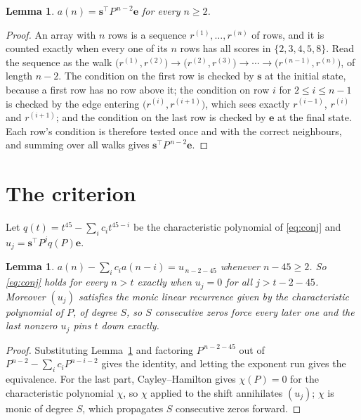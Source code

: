 \documentclass[11pt,a4paper]{article}
\theoremstyle{plain}
\newtheorem{lemma}[theorem]{Lemma}
\theoremstyle{definition}
\begin{document}
\begin{lemma}\label{lem:walk}
$a(n)=\mathbf{s}^{\!\top}P^{\,n-2}\mathbf{e}$ for every $n\ge2$.
\end{lemma}

\begin{proof}
An array with $n$ rows is a sequence $r^{(1)},\dots,r^{(n)}$ of rows, and it is counted
exactly when every one of its $n$ rows has all scores in $\{2,3,4,5,8\}$. Read the sequence as the
walk $\bigl(r^{(1)},r^{(2)}\bigr)\to\bigl(r^{(2)},r^{(3)}\bigr)\to\cdots\to
\bigl(r^{(n-1)},r^{(n)}\bigr)$, of length $n-2$. The condition on the first row is
checked by $\mathbf{s}$ at the initial state, because a first row has no row above it; the
condition on row $i$ for $2\le i\le n-1$ is checked by the edge entering
$\bigl(r^{(i)},r^{(i+1)}\bigr)$, which sees exactly $r^{(i-1)}$, $r^{(i)}$ and
$r^{(i+1)}$; and the condition on the last row is checked by $\mathbf{e}$ at the final
state. Each row's condition is therefore tested once and with the correct neighbours, and
summing over all walks gives $\mathbf{s}^{\!\top}P^{\,n-2}\mathbf{e}$.
\end{proof}

\section{The criterion}

Let $q(t)=t^{45}-\sum_i c_i t^{45-i}$ be the characteristic polynomial of
\eqref{eq:conj} and $u_j=\mathbf{s}^{\!\top}P^{j}q(P)\mathbf{e}$.

\begin{lemma}\label{lem:crit}
$a(n)-\sum_i c_i a(n-i)=u_{\,n-2-45}$ whenever $n-45\ge2$. So \eqref{eq:conj}
holds for every $n>t$ exactly when $u_j=0$ for all $j>t-2-45$. Moreover $(u_j)$
satisfies the monic linear recurrence given by the characteristic polynomial of $P$, of
degree $S$, so $S$ consecutive zeros force every later one and the last nonzero $u_j$ pins
$t$ down exactly.
\end{lemma}

\begin{proof}
Substituting Lemma~\ref{lem:walk} and factoring $P^{\,n-2-45}$ out of
$P^{n-2}-\sum_i c_i P^{n-i-2}$ gives the identity, and letting the exponent run gives the
equivalence. For the last part, Cayley--Hamilton gives $\chi(P)=0$ for the characteristic
polynomial $\chi$, so $\chi$ applied to the shift annihilates $(u_j)$; $\chi$ is monic of
degree $S$, which propagates $S$ consecutive zeros forward.
\end{proof}
\end{document}
